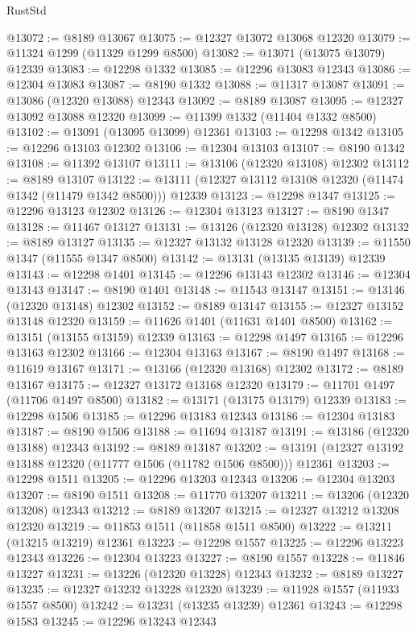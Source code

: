 \begin{lexlean}{RustStd}
\begin{coremodule}
@13072 := @8189 @13067
@13075 := @12327 @13072 @13068 @12320
@13079 := @11324 @1299 (@11329 @1299 @8500)
@13082 := @13071 (@13075 @13079) @12339
@13083 := @12298 @1332
@13085 := @12296 @13083 @12343
@13086 := @12304 @13083
@13087 := @8190 @1332
@13088 := @11317 @13087
@13091 := @13086 (@12320 @13088) @12343
@13092 := @8189 @13087
@13095 := @12327 @13092 @13088 @12320
@13099 := @11399 @1332 (@11404 @1332 @8500)
@13102 := @13091 (@13095 @13099) @12361
@13103 := @12298 @1342
@13105 := @12296 @13103 @12302
@13106 := @12304 @13103
@13107 := @8190 @1342
@13108 := @11392 @13107
@13111 := @13106 (@12320 @13108) @12302
@13112 := @8189 @13107
@13122 := @13111 (@12327 @13112 @13108 @12320 (@11474 @1342 (@11479 @1342 @8500))) @12339
@13123 := @12298 @1347
@13125 := @12296 @13123 @12302
@13126 := @12304 @13123
@13127 := @8190 @1347
@13128 := @11467 @13127
@13131 := @13126 (@12320 @13128) @12302
@13132 := @8189 @13127
@13135 := @12327 @13132 @13128 @12320
@13139 := @11550 @1347 (@11555 @1347 @8500)
@13142 := @13131 (@13135 @13139) @12339
@13143 := @12298 @1401
@13145 := @12296 @13143 @12302
@13146 := @12304 @13143
@13147 := @8190 @1401
@13148 := @11543 @13147
@13151 := @13146 (@12320 @13148) @12302
@13152 := @8189 @13147
@13155 := @12327 @13152 @13148 @12320
@13159 := @11626 @1401 (@11631 @1401 @8500)
@13162 := @13151 (@13155 @13159) @12339
@13163 := @12298 @1497
@13165 := @12296 @13163 @12302
@13166 := @12304 @13163
@13167 := @8190 @1497
@13168 := @11619 @13167
@13171 := @13166 (@12320 @13168) @12302
@13172 := @8189 @13167
@13175 := @12327 @13172 @13168 @12320
@13179 := @11701 @1497 (@11706 @1497 @8500)
@13182 := @13171 (@13175 @13179) @12339
@13183 := @12298 @1506
@13185 := @12296 @13183 @12343
@13186 := @12304 @13183
@13187 := @8190 @1506
@13188 := @11694 @13187
@13191 := @13186 (@12320 @13188) @12343
@13192 := @8189 @13187
@13202 := @13191 (@12327 @13192 @13188 @12320 (@11777 @1506 (@11782 @1506 @8500))) @12361
@13203 := @12298 @1511
@13205 := @12296 @13203 @12343
@13206 := @12304 @13203
@13207 := @8190 @1511
@13208 := @11770 @13207
@13211 := @13206 (@12320 @13208) @12343
@13212 := @8189 @13207
@13215 := @12327 @13212 @13208 @12320
@13219 := @11853 @1511 (@11858 @1511 @8500)
@13222 := @13211 (@13215 @13219) @12361
@13223 := @12298 @1557
@13225 := @12296 @13223 @12343
@13226 := @12304 @13223
@13227 := @8190 @1557
@13228 := @11846 @13227
@13231 := @13226 (@12320 @13228) @12343
@13232 := @8189 @13227
@13235 := @12327 @13232 @13228 @12320
@13239 := @11928 @1557 (@11933 @1557 @8500)
@13242 := @13231 (@13235 @13239) @12361
@13243 := @12298 @1583
@13245 := @12296 @13243 @12343

\end{coremodule}
\end{lexlean}
